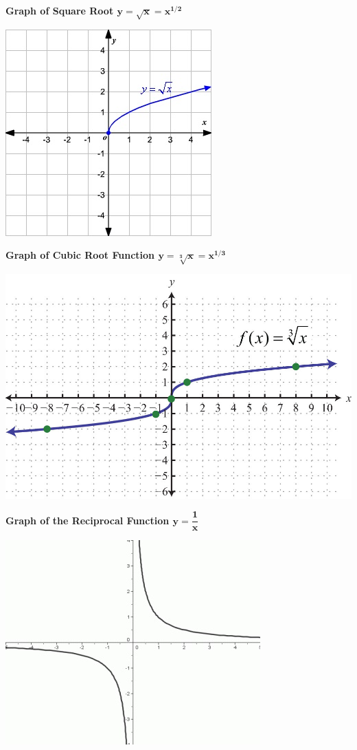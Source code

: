 \documentclass[12pt]{article}
\begin{document}
\textbf{Graph of Square Root $\mathbf{y=\sqrt{x} = x^{1/2}}$}

\includegraphics{SquareRoot.jpg}

\textbf{Graph of Cubic Root Function $\mathbf{y=\sqrt[3]{x} = x^{1/3}}$}

\includegraphics[scale = 0.3]{CubeRootFunction.jpg}

\textbf{Graph of the Reciprocal Function $\mathbf{y=\dfrac{1}{x}}$}

\includegraphics{RecipFunction.jpg}
\end{document}
